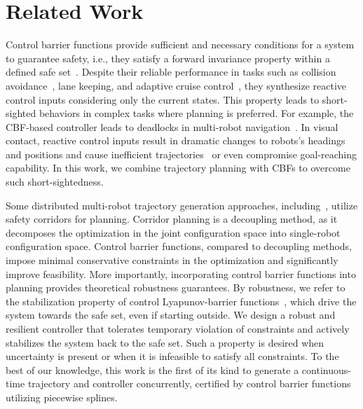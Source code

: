\section{Related Work}
Control barrier functions provide sufficient and necessary conditions for a system to guarantee safety, i.e., they satisfy a forward invariance property within a defined safe set~\cite{ames2019control}. Despite their reliable performance in tasks such as collision avoidance~\cite{abdi2023safe}, lane keeping, and adaptive cruise control~\cite{xu2017correctness}, they synthesize reactive control inputs considering only the current states. This property leads to short-sighted behaviors in complex tasks where planning is preferred. For example, the CBF-based controller leads to deadlocks in multi-robot navigation~\cite{wang2017safety}. In visual contact, reactive control inputs result in dramatic changes to robots's headings and positions and cause inefficient trajectories~\cite{catellani2023distributed} or even compromise goal-reaching capability. 
In this work, we combine trajectory planning with CBFs to overcome such short-sightedness.%

Some distributed multi-robot trajectory generation approaches, including~\cite{luis2020online, csenbacslar2023rlss, zhou2017fast}, utilize safety corridors for planning. Corridor planning is a decoupling method, as it decomposes the optimization in the joint configuration space into single-robot configuration space. Control barrier functions, compared to  decoupling methods, impose minimal conservative constraints in the optimization and significantly improve  feasibility. More importantly, incorporating control barrier functions into planning provides theoretical robustness guarantees. By robustness, we refer to the stabilization property of control Lyapunov-barrier functions~\cite{xiao2021hoclbf}, which drive the system towards the safe set, even if starting outside. We design a robust and resilient controller that tolerates temporary violation of constraints and actively stabilizes the system back to the safe set. Such a property is desired when uncertainty is present or when it is infeasible to satisfy all constraints. To the best of our knowledge, this work is the first of its kind to generate a continuous-time trajectory and controller concurrently, certified by control barrier functions utilizing piecewise splines.

